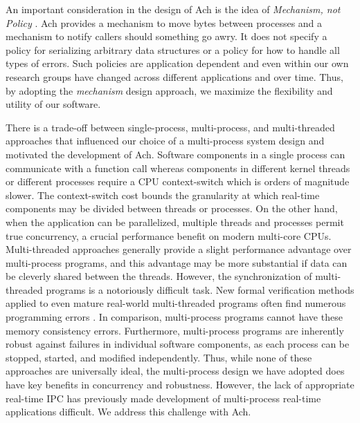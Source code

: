 \documentclass[letterpaper]{IEEEtran}
\begin{document}
An important consideration in the design of Ach is the idea of
\emph{Mechanism, not Policy} \cite{scheifler1987x}.  Ach provides a
mechanism to move bytes between processes and a mechanism to notify
callers should something go awry.  It does not specify a policy for
serializing arbitrary data structures or a policy for how to handle
all types of errors. Such policies are application dependent and even
within our own research groups have changed across different
applications and over time.  Thus, by adopting the \emph{mechanism}
design approach, we maximize the flexibility and utility of our
software.

There is a trade-off between single-process, multi-process, and
multi-threaded approaches that influenced our choice of a
multi-process system design and motivated the development of Ach.
Software components in a single process can communicate with a
function call whereas components in different kernel threads or
different processes require a CPU context-switch which is orders of
magnitude slower.  The context-switch cost bounds the granularity at
which real-time components may be divided between threads or
processes.  On the other hand, when the application can be
parallelized, multiple threads and processes permit true concurrency,
a crucial performance benefit on modern multi-core CPUs.
Multi-threaded approaches generally provide a slight performance
advantage over multi-process programs, and this advantage may be more
substantial if data can be cleverly shared between the threads.
However, the synchronization of multi-threaded programs is a
notoriously difficult task.  New formal verification methods applied
to even mature real-world multi-threaded programs often find numerous
programming errors \cite{musuvathi2008finding,shacham2011testing}.  In
comparison, multi-process programs cannot have these memory
consistency errors.  Furthermore, multi-process programs are
inherently robust against failures in individual software components,
as each process can be stopped, started, and modified independently.
Thus, while none of these approaches are universally ideal, the
multi-process design we have adopted does have key benefits in
concurrency and robustness.  However, the lack of appropriate
real-time IPC has previously made development of multi-process
real-time applications difficult.  We address this challenge with Ach.
\end{document}
